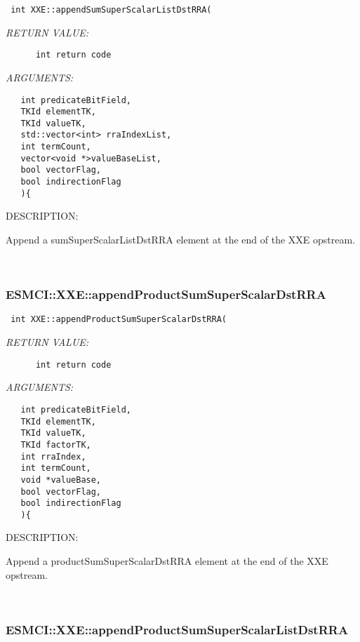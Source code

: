   
\begin{verbatim} int XXE::appendSumSuperScalarListDstRRA(\end{verbatim}{\em RETURN VALUE:}
\begin{verbatim}      int return code\end{verbatim}{\em ARGUMENTS:}
\begin{verbatim}   int predicateBitField,
   TKId elementTK,
   TKId valueTK,
   std::vector<int> rraIndexList,
   int termCount,
   vector<void *>valueBaseList,
   bool vectorFlag,
   bool indirectionFlag
   ){\end{verbatim}
{\sf DESCRIPTION:\\ }


    Append a sumSuperScalarListDstRRA element at the end of the XXE opstream. 
 
\mbox{}\hrulefill\
 
\subsubsection [ESMCI::XXE::appendProductSumSuperScalarDstRRA] {ESMCI::XXE::appendProductSumSuperScalarDstRRA}


  
\begin{verbatim} int XXE::appendProductSumSuperScalarDstRRA(\end{verbatim}{\em RETURN VALUE:}
\begin{verbatim}      int return code\end{verbatim}{\em ARGUMENTS:}
\begin{verbatim}   int predicateBitField,
   TKId elementTK,
   TKId valueTK,
   TKId factorTK,
   int rraIndex,
   int termCount,
   void *valueBase,
   bool vectorFlag,
   bool indirectionFlag
   ){\end{verbatim}
{\sf DESCRIPTION:\\ }


    Append a productSumSuperScalarDstRRA element at the end of the XXE opstream. 
 
\mbox{}\hrulefill\
 
\subsubsection [ESMCI::XXE::appendProductSumSuperScalarListDstRRA] {ESMCI::XXE::appendProductSumSuperScalarListDstRRA}


